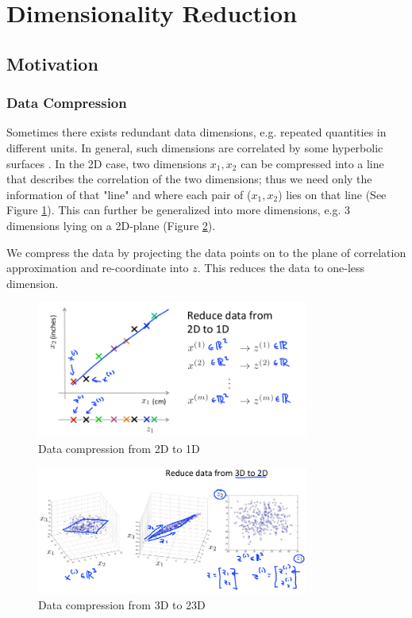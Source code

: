 \section{Dimensionality Reduction}

\subsection{Motivation}
    \subsubsection{Data Compression}
    Sometimes there exists redundant data dimensions, e.g. repeated quantities in different units. In general, such dimensions are correlated by some hyperbolic surfaces . In the 2D case, two dimensions $x_1, x_2$ can be compressed into a line that describes the correlation of the two dimensions; thus we need only the information of that "line" and where each pair of ($x_1, x_2$) lies on that line (See Figure \ref{fig:data-compression-2-1}). This can further be generalized into more dimensions, e.g. 3 dimensions lying on a 2D-plane (Figure \ref{fig:data-compression-3-2}). 

    We compress the data by projecting the data points on to the plane of correlation approximation and re-coordinate into $z$. This reduces the data to one-less dimension. 
    \begin{figure}[htpb]
        \centering
        \includegraphics[width=0.8\textwidth]{image/data-compression-2-1.png}
        \caption{Data compression from 2D to 1D}
        \label{fig:data-compression-2-1}
    \end{figure}

    \begin{figure}[htpb]
        \centering
        \includegraphics[width=0.8\textwidth]{image/data-compression-3-2.png}
        \caption{Data compression from 3D to 23D}
        \label{fig:data-compression-3-2}
    \end{figure}

